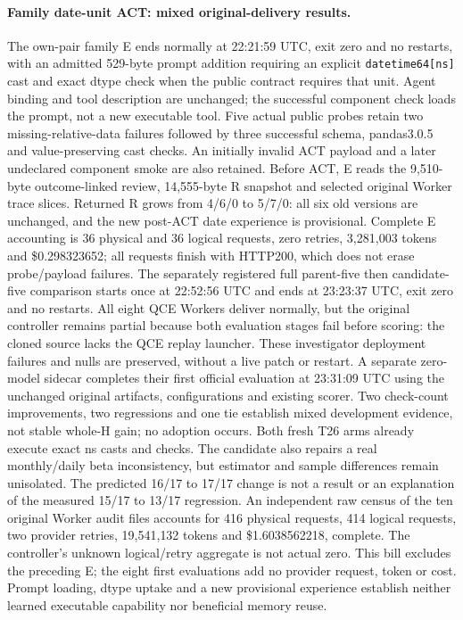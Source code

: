 \paragraph{Family date-unit ACT: mixed original-delivery results.}
The own-pair family E ends normally at 22:21:59 UTC, exit zero and no restarts,
with an admitted 529-byte prompt addition requiring an explicit
\texttt{datetime64[ns]} cast and exact dtype check when the public contract
requires that unit. Agent binding and tool description are unchanged;
the successful component check loads the prompt, not a new executable tool.
Five actual public probes retain two missing-relative-data failures followed
by three successful schema, pandas3.0.5 and value-preserving cast checks.
An initially invalid ACT payload and a later undeclared component smoke are
also retained. Before ACT, E reads the 9,510-byte outcome-linked review,
14,555-byte R snapshot and selected original Worker trace slices. Returned R
grows from 4/6/0 to 5/7/0: all six old versions are unchanged, and the new
post-ACT date experience is provisional. Complete E accounting is 36 physical
and 36 logical requests, zero retries, 3{,}281{,}003 tokens and \$0.298323652;
all requests finish with HTTP200, which does not erase probe/payload failures.
The separately registered full parent-five then candidate-five comparison
starts once at 22:52:56 UTC and ends at 23:23:37 UTC, exit zero and no
restarts. All eight QCE Workers deliver normally, but the original controller
remains partial because both evaluation stages fail before scoring: the
cloned source lacks the QCE replay launcher. These investigator deployment
failures and nulls are preserved, without a live patch or restart. A separate
zero-model sidecar completes their first official evaluation at 23:31:09 UTC
using the unchanged original artifacts, configurations and existing scorer.
Two check-count improvements, two regressions and one tie establish mixed
development evidence, not stable whole-H gain; no adoption occurs.
Both fresh T26 arms already execute exact ns casts and checks. The candidate
also repairs a real monthly/daily beta inconsistency, but estimator and sample
differences remain unisolated. The predicted 16/17 to 17/17 change is not a
result or an explanation of the measured 15/17 to 13/17 regression.
An independent raw census of the ten original Worker audit files accounts for
416 physical requests, 414 logical requests, two provider retries,
19{,}541{,}132 tokens and \$1.6038562218, complete. The controller's unknown
logical/retry aggregate is not actual zero. This bill excludes the preceding
E; the eight first evaluations add no provider request, token or cost.
Prompt loading, dtype uptake and a new provisional experience establish
neither learned executable capability nor beneficial memory reuse.

